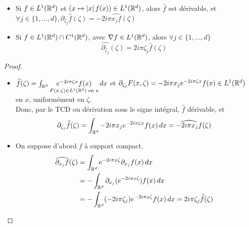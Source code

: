 \documentclass[]{report}
\begin{document}
    \begin{prop}{}{}
        \begin{itemize}
            \item Si $f\in L^1(\mathbb{R}^d)$ et $(x\mapsto \left|x\right|f(x))\in L^1(\mathbb{R}^d)$, alors $\widehat{f}$ est dérivable, et $\forall j\in \{1,\ldots,d\},\partial_{\zeta_j}\widehat{f}(\zeta)=-2i\pi  \widehat{ x_j f}(\zeta)$
            \item Si $f\in L^1(\mathbb{R}^d)\cap C^1(\mathbb{R}^d)$, avec $\nabla f\in L^1(\mathbb{R}^d)$, alors $\forall j\in \{1,\ldots,d\}$
            \[\widehat{\partial_{\zeta_j}}(\zeta)=2i\pi \zeta_j \widehat{f}(\zeta)\]
        \end{itemize}
    \end{prop}

    \begin{proof}
        \begin{itemize}
            \item $\widehat{f}(\zeta)=\int_{\mathbb{R}^d}\underset{F(x,\zeta)\in L^1(\mathbb{R}^d)\text{ en x}}{e^{-2i\pi\zeta x}f(x)}\, dx$ et $\partial_{\zeta_j}F(x,\zeta)=-2i\pi x_j e^{-2i\pi\zeta x}f(x)\in L^1(\mathbb{R}^d)$ en $x$, uniformément en $\zeta$.\\
            Donc, par le TCD ou dérivation sous le signe intégral, $\widehat{f}$ dérivable, et
            \[\partial_{\zeta_j}\widehat{f}(\zeta)=\int_{\mathbb{R}^d}-2i\pi x_j e^{-2i\pi \zeta x}f(x)\, dx=\widehat{-2i\pi x_j f}(\zeta)\]
            \item On suppose d'abord $f$ à support compact.
            \begin{align*}
                \widehat{\partial_{x_j}f}(\zeta)&=\int_{\mathbb{R}^d}e^{-2i\pi x\zeta}\partial_{x_j}f(x)\, dx\\
                &=-\int_{\mathbb{R}^d}\partial_{x_j}(e^{-2i\pi x\zeta})f(x)\, dx\\
                &=-\int_{\mathbb{R}^d}(-2i\pi\zeta_j)e^{-2i\pi x \zeta}f(x)\, dx=2i\pi \zeta_j \widehat{f}(\zeta)
            \end{align*}
        \end{itemize}
    \end{proof}
\end{document}
